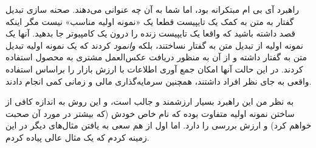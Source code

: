 راهبرد آی بی ام مبتکرانه بود، اما شما به آن چه عنوانی می‌دهند. صحنه سازی
تبدیل گفتار به متن به کمک یک تایپیست قطعا یک «نمونه اولیه مناسب» نیست
مگر اینکه قصد داشته باشید که واقعا یک تایپیست زنده را درون یک کامپیوتر
جا بدهید. آنها یک نمونه اولیه از تبدیل متن به گفتار نساختند، بلکه
\emph{وانمود} کردند که یک نمونه اولیه تبدیل متن به گفتار داشته و از آن
به منظور دریافت عکس‌العمل مشتری به محصول استفاده کردند. در این حالت آنها
امکان جمع آوری اطلاعات با ارزش بازار را براساس استفاده واقعی به جای نظر
افراد داشتند، همچنین سرمایه‌گذاری مالی و زمانی کمی انجام دادند.

به نظر من این راهبرد بسیار ارزشمند و جالب است، و این روش به اندازه کافی
از ساختن نمونه اولیه متفاوت بوده که نام خاص خودش (که بیشتر در مورد آن
صحبت خواهم کرد) و ارزش بررسی را دارد. اما اول از هم سعی به یافتن
مثال‌های دیگر در این زمینه کردم که یک مثال عالی پیاده کردم.
